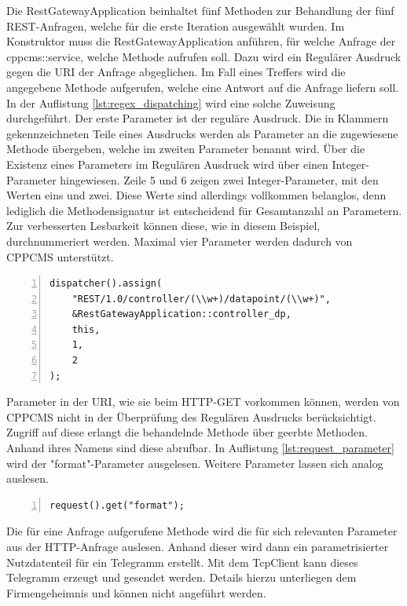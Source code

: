 \documentclass{article}
\begin{document}
Die RestGatewayApplication beinhaltet fünf Methoden zur Behandlung der fünf REST-Anfragen, welche für die erste Iteration ausgewählt wurden. Im Konstruktor muss die RestGatewayApplication anführen, für welche Anfrage der cppcms::service, welche Methode aufrufen soll. Dazu wird ein Regulärer Ausdruck gegen die URI der Anfrage abgeglichen. Im Fall eines Treffers wird die angegebene Methode aufgerufen, welche eine Antwort auf die Anfrage liefern soll. In der Auflistung \ref{lst:regex_dispatching} wird eine solche Zuweisung durchgeführt. Der erste Parameter ist der reguläre Ausdruck. Die in Klammern gekennzeichneten Teile eines Ausdrucks werden als Parameter an die zugewiesene Methode übergeben, welche im zweiten Parameter benannt wird. Über die Existenz eines Parameters im Regulären Ausdruck wird über einen Integer-Parameter hingewiesen. Zeile 5 und 6 zeigen zwei Integer-Parameter, mit den Werten eins und zwei. Diese Werte sind allerdings vollkommen belanglos, denn lediglich die Methodensignatur ist entscheidend für Gesamtanzahl an Parametern. Zur verbesserten Lesbarkeit können diese, wie in diesem Beispiel, durchnummeriert werden. Maximal vier Parameter werden dadurch von CPPCMS unterstützt.

\lstset{language=C++}
\begin{lstlisting}[caption=URI Zuweisung mit Regulärem Ausdruck, label=lst:regex_dispatching, frame=single, numbers=left, tabsize=3, captionpos=b]
dispatcher().assign(
	"REST/1.0/controller/(\\w+)/datapoint/(\\w+)", 
	&RestGatewayApplication::controller_dp,
	this,
	1,
	2
);
\end{lstlisting}

Parameter in der URI, wie sie beim HTTP-GET vorkommen können, werden von CPPCMS nicht in der Überprüfung des Regulären Ausdrucks berücksichtigt. Zugriff auf diese erlangt die behandelnde Methode über geerbte Methoden. Anhand ihres Namens sind diese abrufbar. In Auflistung \ref{lst:request_parameter} wird der "format"-Parameter ausgelesen. Weitere Parameter lassen sich analog auslesen.

\lstset{language=C++}
\begin{lstlisting}[caption=Anfrage-Parameter auslesen, label=lst:request_parameter, frame=single, numbers=left, tabsize=3, captionpos=b]
request().get("format");
\end{lstlisting}

Die für eine Anfrage aufgerufene Methode wird die für sich relevanten Parameter aus der HTTP-Anfrage auslesen. Anhand dieser wird dann ein parametrisierter Nutzdatenteil für ein Telegramm erstellt. Mit dem TcpClient kann dieses Telegramm erzeugt und gesendet werden. Details hierzu unterliegen dem Firmengeheimnis und können nicht angeführt werden.
\end{document}
